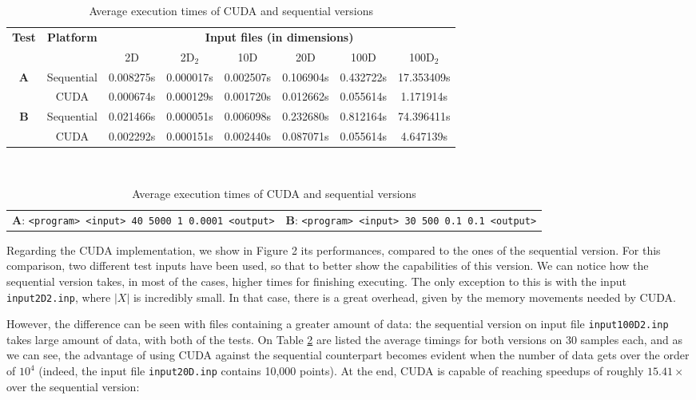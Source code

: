 \documentclass[11pt, journal]{IEEEtran}
\newcommand{\nwl}{

\vspace{11pt}

}
\begin{document}
\begin{table}
    \renewcommand{\arraystretch}{1.3}
    \caption{Average execution times of CUDA and sequential versions}
    \label{cuda_seq_exec}
    \centering
    \begin{tabular}{|c|c||c|c|c|c|c|c|}
    \hline
    \multirow{2}{*}{\textbf{Test}} & \multirow{2}{*}{\textbf{Platform}} & \multicolumn{6}{|c|}{\textbf{Input files (in dimensions)}} \\\cline{3-8}
     & & 2D & 2D$_2$ & 10D & 20D & 100D & 100D$_2$ \\
    \hline\hline
    \multirow{2}{*}{\textbf{A}} & Sequential & 0.008275s & 0.000017s & 0.002507s & 0.106904s & 0.432722s & 17.353409s \\\cline{2-8}
     & CUDA & 0.000674s & 0.000129s & 0.001720s & 0.012662s & 0.055614s & 1.171914s \\
    \hline
    \multirow{2}{*}{\textbf{B}} & Sequential & 0.021466s & 0.000051s & 0.006098s & 0.232680s & 0.812164s & 74.396411s \\\cline{2-8}
     & CUDA & 0.002292s & 0.000151s & 0.002440s & 0.087071s & 0.055614s & 4.647139s \\
    \hline
    \end{tabular}
    \\
    \nwl
    \begin{tabular}{c c}
    \textbf{A}: \verb|<program> <input> 40 5000 1 0.0001 <output>| & \textbf{B}: \verb|<program> <input> 30 500 0.1 0.1 <output>|        
    \end{tabular}
\end{table}

Regarding the CUDA implementation, we show in Figure 2 its performances, compared to the ones of the sequential version. For this comparison, two different test inputs have been used, so that to better show the capabilities of this version. We can notice how the sequential version takes, in most of the cases, higher times for finishing executing. The only exception to this is with the input \verb|input2D2.inp|, where $|X|$ is incredibly small. In that case, there is a great overhead, given by the memory movements needed by CUDA.
\nwl
However, the difference can be seen with files containing a greater amount of data: the sequential version on input file \verb|input100D2.inp| takes large amount of data, with both of the tests. On Table \ref{cuda_seq_exec} are listed the average timings for both versions on 30 samples each, and as we can see, the advantage of using CUDA against the sequential counterpart becomes evident when the number of data gets over the order of $10^4$ (indeed, the input file \verb|input20D.inp| contains 10,000 points). At the end, CUDA is capable of reaching speedups of roughly $15.41\times$ over the sequential version:
\end{document}
